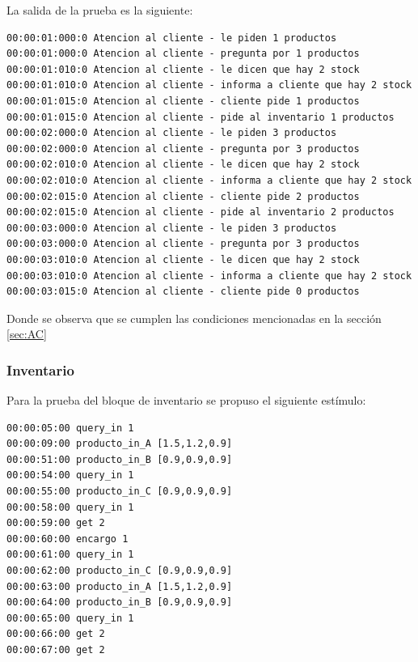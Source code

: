 \documentclass[10pt]{article}
\begin{document}
La salida de la prueba es la siguiente:

\begin{minipage}{1\textwidth}
	\centering
	\begin{lstlisting}
00:00:01:000:0 Atencion al cliente - le piden 1 productos
00:00:01:000:0 Atencion al cliente - pregunta por 1 productos
00:00:01:010:0 Atencion al cliente - le dicen que hay 2 stock
00:00:01:010:0 Atencion al cliente - informa a cliente que hay 2 stock
00:00:01:015:0 Atencion al cliente - cliente pide 1 productos
00:00:01:015:0 Atencion al cliente - pide al inventario 1 productos
00:00:02:000:0 Atencion al cliente - le piden 3 productos
00:00:02:000:0 Atencion al cliente - pregunta por 3 productos
00:00:02:010:0 Atencion al cliente - le dicen que hay 2 stock
00:00:02:010:0 Atencion al cliente - informa a cliente que hay 2 stock
00:00:02:015:0 Atencion al cliente - cliente pide 2 productos
00:00:02:015:0 Atencion al cliente - pide al inventario 2 productos
00:00:03:000:0 Atencion al cliente - le piden 3 productos
00:00:03:000:0 Atencion al cliente - pregunta por 3 productos
00:00:03:010:0 Atencion al cliente - le dicen que hay 2 stock
00:00:03:010:0 Atencion al cliente - informa a cliente que hay 2 stock
00:00:03:015:0 Atencion al cliente - cliente pide 0 productos

	\end{lstlisting}
	
\end{minipage}
Donde se observa que se cumplen las condiciones mencionadas en la sección \ref{sec:AC}

\subsubsection{Inventario}
Para la prueba del bloque de inventario se propuso el siguiente estímulo:

\begin{minipage}{1\textwidth}
	\centering
	\begin{lstlisting}
00:00:05:00 query_in 1
00:00:09:00 producto_in_A [1.5,1.2,0.9]
00:00:51:00 producto_in_B [0.9,0.9,0.9]
00:00:54:00 query_in 1
00:00:55:00 producto_in_C [0.9,0.9,0.9]
00:00:58:00 query_in 1
00:00:59:00 get 2
00:00:60:00 encargo 1
00:00:61:00 query_in 1
00:00:62:00 producto_in_C [0.9,0.9,0.9]
00:00:63:00 producto_in_A [1.5,1.2,0.9]
00:00:64:00 producto_in_B [0.9,0.9,0.9]
00:00:65:00 query_in 1
00:00:66:00 get 2
00:00:67:00 get 2
	\end{lstlisting}
\end{minipage}
\end{document}
